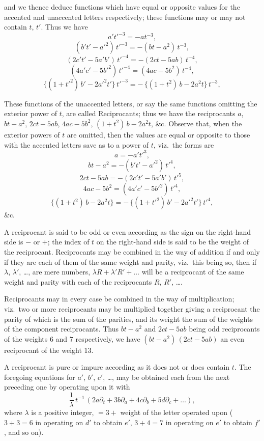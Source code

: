 \documentclass[11pt]{article}
\begin{document}
and we thence deduce functions which have equal or opposite values for the accented and unaccented letters respectively; these functions may or may not contain $t$, $t'$. Thus we have
\[
a' t'^{-3} = -a t^{-3},
\]
\[
(b' t' - a'^2)\,t'^{-3} = -(b t - a^2)\,t^{-3},
\]
\[
(2 c' t' - 5 a' b')\,t'^{-4} = -(2 c t - 5 a b)\,t^{-4},
\]
\[
(4 a' c' - 5 b'^2)\,t'^{-4} = (4 a c - 5 b^2)\,t^{-4},
\]
\[
\{(1 + t'^2)\,b' - 2 a'^2 t'\}\,t'^{-3} = -\,\{(1 + t^2)\,b - 2 a^2 t\}\,t^{-3},
\]

These functions of the unaccented letters, or say the same functions omitting the exterior power of $t$, are called Reciprocants; thus we have the reciprocants $a$, $b t - a^2$, $2 c t - 5 a b$, $4 a c - 5 b^2$, $(1 + t^2)\,b - 2 a^2 t$, \&c. Observe that, when the exterior powers of $t$ are omitted, then the values are equal or opposite to those with the accented letters save as to a power of $t$, viz.\ the forms are
\[
a = -a' t'^3,
\]
\[
b t - a^2 = -(b' t' - a'^2)\,t'^4,
\]
\[
2 c t - 5 a b = -(2 c' t' - 5 a' b')\,t'^5,
\]
\[
4 a c - 5 b^2 = (4 a' c' - 5 b'^2)\,t'^4,
\]
\[
\{(1 + t^2)\,b - 2 a^2 t\} = -\,\{(1 + t'^2)\,b' - 2 a'^2 t'\}\,t'^4,
\]
\&c.

A reciprocant is said to be odd or even according as the sign on the right-hand side is $-$ or $+$; the index of $t$ on the right-hand side is said to be the weight of the reciprocant. Reciprocants may be combined in the way of addition if and only if they are each of them of the same weight and parity, viz.\ this being so, then if $\lambda$, $\lambda'$, \ldots, are mere numbers, $\lambda R + \lambda' R' + \ldots$ will be a reciprocant of the same weight and parity with each of the reciprocants $R$, $R'$, \ldots.

Reciprocants may in every case be combined in the way of multiplication; viz.\ two or more reciprocants may be multiplied together giving a reciprocant the parity of which is the sum of the parities, and its weight the sum of the weights of the component reciprocants. Thus $b t - a^2$ and $2 c t - 5 a b$ being odd reciprocants of the weights $6$ and $7$ respectively, we have $(b t - a^2)\,(2 c t - 5 a b)$ an even reciprocant of the weight $13$.

A reciprocant is pure or impure according as it does not or does contain $t$. The foregoing equations for $a'$, $b'$, $c'$, \ldots, may be obtained each from the next preceding one by operating upon it with
\[
\frac{1}{\lambda}\,t^{-1}\,(2 a\partial_t + 3 b\partial_a + 4 c\partial_b + 5 d\partial_c + \ldots),
\]
where $\lambda$ is a positive integer, $= 3 +$ weight of the letter operated upon ($3 + 3 = 6$ in operating on $d'$ to obtain $e'$, $3 + 4 = 7$ in operating on $e'$ to obtain $f'$, and so on).
\end{document}

